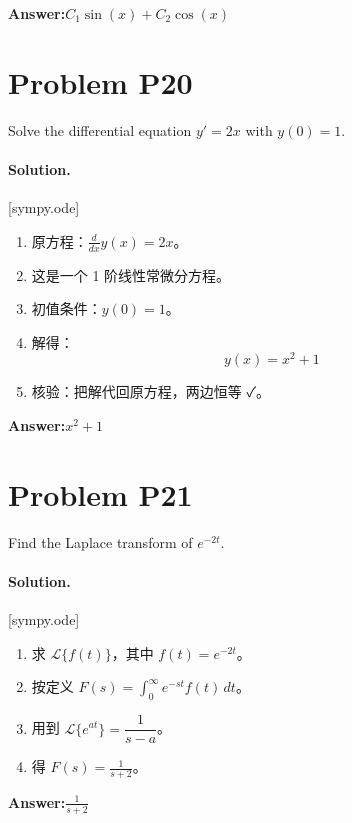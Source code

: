 \documentclass[11pt,a4paper]{ctexart}
\newcommand{\solvertag}[1]{{\footnotesize\color{gray}\textsf{[#1]}}}
\begin{document}
\noindent\textbf{Answer:}\quad $C_{1} \sin{\left(x \right)} + C_{2} \cos{\left(x \right)}$

\medskip

\section*{Problem P20}
Solve the differential equation $y' = 2x$ with $y(0) = 1$.

\paragraph{Solution.} \solvertag{sympy.ode} 

\begin{enumerate}[leftmargin=*]
  \item 原方程：$\frac{d}{d x} y{\left(x \right)} = 2 x$。
  \item 这是一个 1 阶线性常微分方程。
  \item 初值条件：$y{\left(0 \right)} = 1$。
  \item 解得：$$y{\left(x \right)} = x^{2} + 1$$
  \item 核验：把解代回原方程，两边恒等 ✓。
\end{enumerate}

\noindent\textbf{Answer:}\quad $x^{2} + 1$

\medskip

\section*{Problem P21}
Find the Laplace transform of $e^{-2t}$.

\paragraph{Solution.} \solvertag{sympy.ode} 

\begin{enumerate}[leftmargin=*]
  \item 求 $\mathcal{L}\{f(t)\}$，其中 $f(t) = e^{- 2 t}$。
  \item 按定义 $F(s) = \int_0^{\infty} e^{-st} f(t)\,dt$。
  \item 用到 $\mathcal{L}\{e^{at}\} = \dfrac{1}{s-a}$。
  \item 得 $F(s) = \frac{1}{s + 2}$。
\end{enumerate}

\noindent\textbf{Answer:}\quad $\frac{1}{s + 2}$

\medskip
\end{document}

